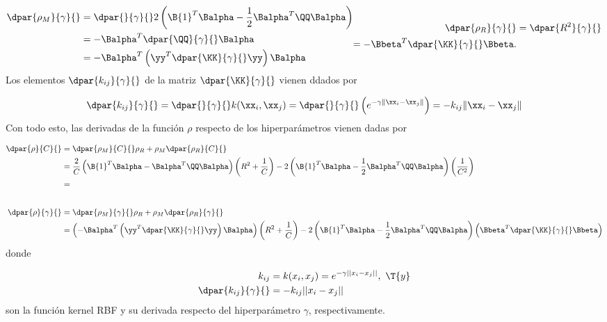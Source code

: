 \begin{align}
  \begin{aligned}
    \dpar{\rho_M}{\gamma}{}
    &= \dpar{}{\gamma}{} 2\left(  \B{1}^T\Balpha-\frac{1}{2}\Balpha^T\QQ\Balpha \right) \\
    &= - \Balpha^T \dpar{\QQ}{\gamma}{}\Balpha \\
    & = - \Balpha^T \left(\yy^T \dpar{\KK}{\gamma}{}\yy\right) \Balpha
  \end{aligned}
  \begin{aligned}
    \dpar{\rho_R}{\gamma}{} &= \dpar{R^2}{\gamma}{} \\
    = - \Bbeta^T \dpar{\KK}{\gamma}{} \Bbeta. %
  \end{aligned}
\end{align}
Los elementos $\dpar{k_{ij}}{\gamma}{}$ de la matriz $\dpar{\KK}{\gamma}{}$ 
vienen ddados por

\begin{align}
  \dpar{k_{ij}}{\gamma}{}
  = \dpar{}{\gamma}{}k(\xx_i,\xx_j)
  = \dpar{}{\gamma}{} \left(e^{-\gamma\|\xx_i-\xx_j\|}\right)
  = -k_{ij}\|\xx_i-\xx_j\|
\end{align}
Con todo esto, las derivadas de la función $\rho$ respecto de los
hiperparámetros vienen dadas por

\begin{align*}
    \dpar{\rho}{C}{} &= \dpar{\rho_M}{C}{} \rho_R + \rho_M \dpar{\rho_R}{C}{} \\
    &= \frac{2}{C} \left(\B{1}^T\Balpha - \Balpha^T\QQ\Balpha\right) \left( R^2 + \frac{1}{C} \right)
    - 2\left(  \B{1}^T\Balpha-\frac{1}{2}\Balpha^T\QQ\Balpha \right)
    \left( \frac{1}{C^2} \right)\\
    &=
  \\[2em]
    \dpar{\rho}{\gamma}{} &= \dpar{\rho_M}{\gamma}{} \rho_R + \rho_M \dpar{\rho_R}{\gamma}{}\\
    &= \left( - \Balpha^T \left(\yy^T \dpar{\KK}{\gamma}{}\yy\right) \Balpha \right)
    \left( R^2 + \frac{1}{C} \right)
    - 2\left(  \B{1}^T\Balpha-\frac{1}{2}\Balpha^T\QQ\Balpha \right)
    \left( \Bbeta^T \dpar{\KK}{\gamma}{} \Bbeta \right)
\end{align*}
donde

\begin{align}
  k_{ij}&=k(x_i,x_j)=e^{-\gamma||x_i-x_j||},\,\, \T{y} \\
  \dpar{k_{ij}}{\gamma}{}&=-k_{ij}||x_i-x_j||
\end{align}
son la función kernel RBF y su derivada respecto del hiperparámetro $\gamma$,
respectivamente.

